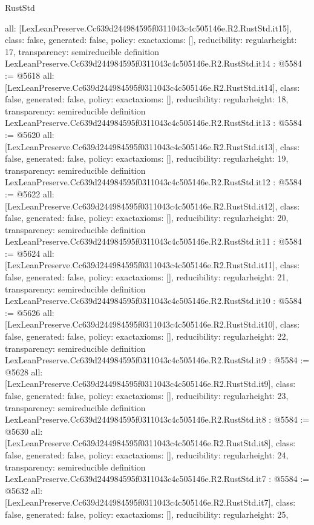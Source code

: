 \begin{lexlean}{RustStd}
\begin{coremodule}
{  all: [LexLeanPreserve.Cc639d244984595f0311043c4c505146e.R2.RustStd.it15],
  class: false,
  generated: false,
  policy: exact{axioms: []},
  reducibility: regular{height: 17},
  transparency: semireducible
}
definition LexLeanPreserve.Cc639d244984595f0311043c4c505146e.R2.RustStd.it14 : @5584 := @5618 {
  all: [LexLeanPreserve.Cc639d244984595f0311043c4c505146e.R2.RustStd.it14],
  class: false,
  generated: false,
  policy: exact{axioms: []},
  reducibility: regular{height: 18},
  transparency: semireducible
}
definition LexLeanPreserve.Cc639d244984595f0311043c4c505146e.R2.RustStd.it13 : @5584 := @5620 {
  all: [LexLeanPreserve.Cc639d244984595f0311043c4c505146e.R2.RustStd.it13],
  class: false,
  generated: false,
  policy: exact{axioms: []},
  reducibility: regular{height: 19},
  transparency: semireducible
}
definition LexLeanPreserve.Cc639d244984595f0311043c4c505146e.R2.RustStd.it12 : @5584 := @5622 {
  all: [LexLeanPreserve.Cc639d244984595f0311043c4c505146e.R2.RustStd.it12],
  class: false,
  generated: false,
  policy: exact{axioms: []},
  reducibility: regular{height: 20},
  transparency: semireducible
}
definition LexLeanPreserve.Cc639d244984595f0311043c4c505146e.R2.RustStd.it11 : @5584 := @5624 {
  all: [LexLeanPreserve.Cc639d244984595f0311043c4c505146e.R2.RustStd.it11],
  class: false,
  generated: false,
  policy: exact{axioms: []},
  reducibility: regular{height: 21},
  transparency: semireducible
}
definition LexLeanPreserve.Cc639d244984595f0311043c4c505146e.R2.RustStd.it10 : @5584 := @5626 {
  all: [LexLeanPreserve.Cc639d244984595f0311043c4c505146e.R2.RustStd.it10],
  class: false,
  generated: false,
  policy: exact{axioms: []},
  reducibility: regular{height: 22},
  transparency: semireducible
}
definition LexLeanPreserve.Cc639d244984595f0311043c4c505146e.R2.RustStd.it9 : @5584 := @5628 {
  all: [LexLeanPreserve.Cc639d244984595f0311043c4c505146e.R2.RustStd.it9],
  class: false,
  generated: false,
  policy: exact{axioms: []},
  reducibility: regular{height: 23},
  transparency: semireducible
}
definition LexLeanPreserve.Cc639d244984595f0311043c4c505146e.R2.RustStd.it8 : @5584 := @5630 {
  all: [LexLeanPreserve.Cc639d244984595f0311043c4c505146e.R2.RustStd.it8],
  class: false,
  generated: false,
  policy: exact{axioms: []},
  reducibility: regular{height: 24},
  transparency: semireducible
}
definition LexLeanPreserve.Cc639d244984595f0311043c4c505146e.R2.RustStd.it7 : @5584 := @5632 {
  all: [LexLeanPreserve.Cc639d244984595f0311043c4c505146e.R2.RustStd.it7],
  class: false,
  generated: false,
  policy: exact{axioms: []},
  reducibility: regular{height: 25},
}
\end{coremodule}
\end{lexlean}
